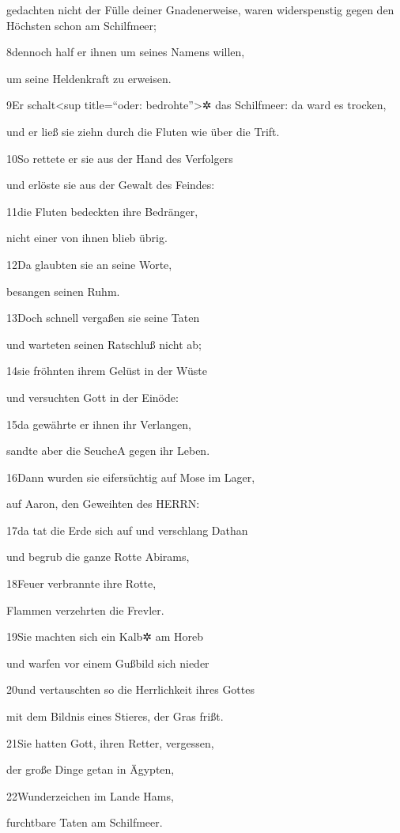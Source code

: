 gedachten nicht der Fülle deiner Gnadenerweise, waren widerspenstig
gegen den Höchsten schon am Schilfmeer;

8dennoch half er ihnen um seines Namens willen,

um seine Heldenkraft zu erweisen.

9Er schalt\textless sup title=``oder: bedrohte''\textgreater✲ das
Schilfmeer: da ward es trocken,

und er ließ sie ziehn durch die Fluten wie über die Trift.

10So rettete er sie aus der Hand des Verfolgers

und erlöste sie aus der Gewalt des Feindes:

11die Fluten bedeckten ihre Bedränger,

nicht einer von ihnen blieb übrig.

12Da glaubten sie an seine Worte,

besangen seinen Ruhm.

13Doch schnell vergaßen sie seine Taten

und warteten seinen Ratschluß nicht ab;

14sie fröhnten ihrem Gelüst in der Wüste

und versuchten Gott in der Einöde:

15da gewährte er ihnen ihr Verlangen,

sandte aber die Seuche{A} gegen ihr Leben.

16Dann wurden sie eifersüchtig auf Mose im Lager,

auf Aaron, den Geweihten des HERRN:

17da tat die Erde sich auf und verschlang Dathan

und begrub die ganze Rotte Abirams,

18Feuer verbrannte ihre Rotte,

Flammen verzehrten die Frevler.

19Sie machten sich ein Kalb✲ am Horeb

und warfen vor einem Gußbild sich nieder

20und vertauschten so die Herrlichkeit ihres Gottes

mit dem Bildnis eines Stieres, der Gras frißt.

21Sie hatten Gott, ihren Retter, vergessen,

der große Dinge getan in Ägypten,

22Wunderzeichen im Lande Hams,

furchtbare Taten am Schilfmeer.

